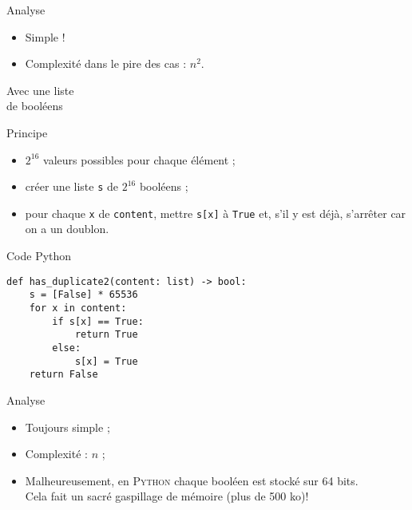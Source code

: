 \documentclass[12pt]{nsibeamer}
\begin{document}
%

\begin{frame}{Analyse}
\pause
\begin{itemize}
	\item Simple !\pause
	\item Complexité dans le pire des cas : \pause $n^2$.
\end{itemize}
\end{frame}

%

\begin{frame}[standout]
	\begin{center}
		\Huge
		Avec une liste\\
		de booléens
	\end{center}
\end{frame}

%

\begin{frame}[fragile]{Principe}
\begin{itemize}
	\item $2^16$ valeurs possibles pour chaque élément ;\pause
	\item créer une liste \texttt{s} de $2^16$ booléens ;\pause
	\item pour chaque \texttt{x} de \texttt{content}, mettre \texttt{s[x]} à \texttt{True} et, s'il y est déjà, s'arrêter car on a un doublon.
\end{itemize}
\end{frame}

%

\begin{frame}[fragile]{Code Python}
\begin{verbatim}
def has_duplicate2(content: list) -> bool:
    s = [False] * 65536
    for x in content:
        if s[x] == True:
            return True
        else:
            s[x] = True
    return False
\end{verbatim}
\end{frame}

%

\begin{frame}[fragile]{Analyse}
\begin{itemize}
	\item Toujours simple ;\pause
	\item Complexité : $n$ ;\pause
	\item Malheureusement, en \textsc{Python} chaque booléen est stocké sur 64 bits.\pause\\
	Cela fait un sacré gaspillage de mémoire (plus de 500 ko)!
\end{itemize}
\end{frame}
\end{document}
